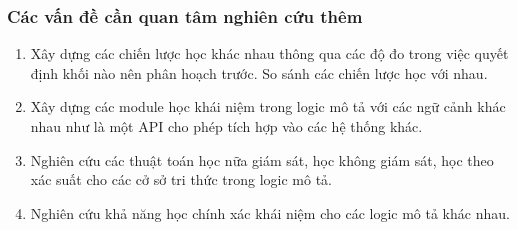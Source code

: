 \documentclass[notheorems,xcolor=dvipsnames]{beamer}
\begin{document}
\begin{frame}\frametitle{\bf Các vấn đề cần quan tâm nghiên cứu thêm}
	\begin{enumerate}
		\setlength{\itemsep}{1.5ex}
		\item Xây dựng các chiến lược học khác nhau thông qua các độ đo trong việc quyết định khối nào nên phân hoạch trước. So sánh các chiến lược học với nhau.
		
		\item Xây dựng các module học khái niệm trong logic mô tả với các ngữ cảnh khác nhau như là một API cho phép tích hợp vào các hệ thống khác.
		
		\item Nghiên cứu các thuật toán học nữa giám sát, học không giám sát, học theo xác suất cho các cở sở tri thức trong logic mô tả.
		
		\item Nghiên cứu khả năng học chính xác khái niệm cho các logic mô tả khác nhau.
	\end{enumerate}
\end{frame}
\end{document}
